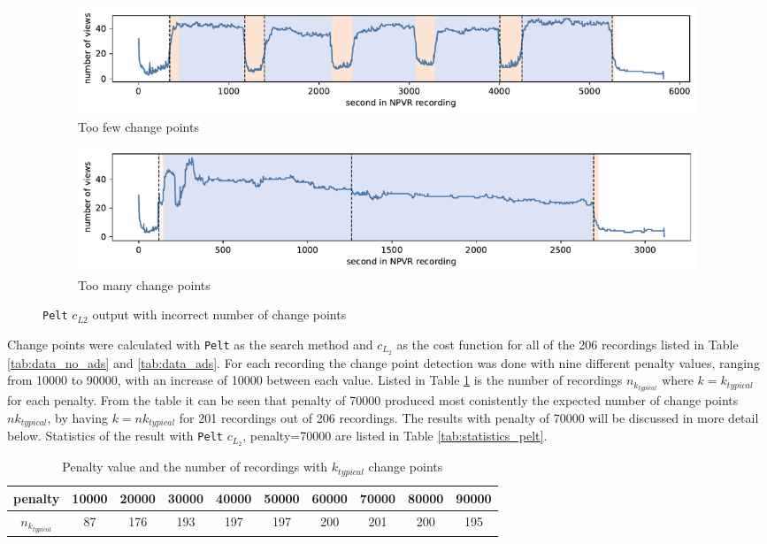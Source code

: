 \begin{figure}[H]
    \centering
    \begin{subfigure}[b]{\textwidth}
       \includegraphics[width=1\textwidth]{../plots/too_few_k.pdf}
       \caption{Too few change points}
       \label{fig:pelt_too_few} 
    \end{subfigure}
    \par\bigskip
    \begin{subfigure}[b]{\textwidth}
       \includegraphics[width=1\textwidth]{../plots/too_many_k.pdf}
       \caption{Too many change points}
       \label{fig:pelt_too_many}
    \end{subfigure}
    \caption{\texttt{Pelt} $c_{L2}$ output with incorrect number of change points}
    \label{fig:ruptures_wrong_k}
\end{figure} 

Change points were calculated with \texttt{Pelt} as the search method and $c_{L_2}$ as the cost function for all of the 206 recordings listed in Table \ref{tab:data_no_ads} and \ref{tab:data_ads}. For each recording the change point detection was done with nine different penalty values, ranging from 10000 to 90000, with an increase of 10000 between each value. Listed in Table \ref{tab:penalty_k} is the number of recordings $n_{k_{typical}}$ where $k=k_{typical}$ for each penalty. From the table it can be seen that penalty of 70000 produced most conistently the expected number of change points $nk_{typical}$, by having $k=nk_{typical}$ for 201 recordings out of 206 recordings. The results with penalty of 70000 will be discussed in more detail below. Statistics of the result with \texttt{Pelt} $c_{L_2}$, penalty=70000 are listed in Table \ref{tab:statistics_pelt}.

\begin{table}[H]
    \begin{center}
    \begin{tabular}{|c|c|c|c|c|c|c|c|c|c|}
        \hline
        \textbf{penalty} & 10000 & 20000 & 30000 & 40000 & 50000 & 60000 & 70000 & 80000 & 90000 \\ \hline
        $n_{k_{typical}}$ & 87 & 176 & 193 & 197 & 197 & 200 & 201 & 200 & 195 \\ \hline
    \end{tabular}
    \end{center}
    \caption{Penalty value and the number of recordings with $k_{typical}$ change points}
    \label{tab:penalty_k}
\end{table}


